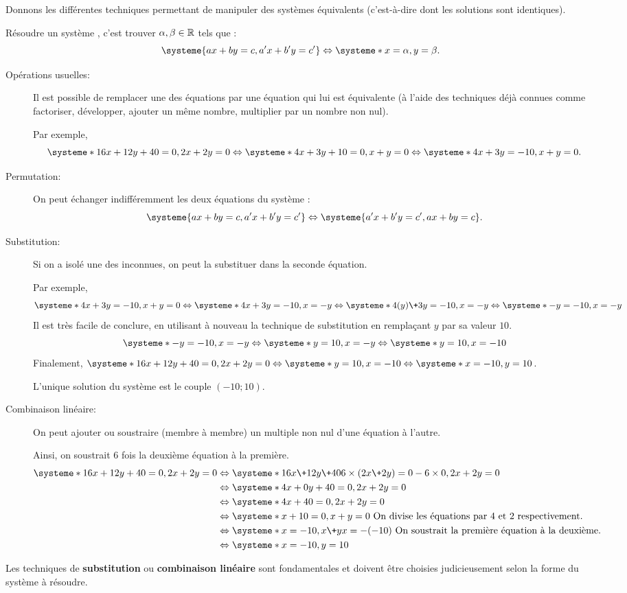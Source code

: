 \documentclass[cours,couleur]{mathsRC}
\begin{document}
\begin{methode}
Donnons les différentes techniques permettant de manipuler des systèmes équivalents (c'est-à-dire dont les solutions sont identiques). 

Résoudre un système  , c'est trouver $\alpha,\beta\in\mathbb{R}$ tels que :
\[
\systeme{ax+by=c,a'x+b'y=c'} \ssi \systeme*{x=\alpha,y=\beta}.
\]
\begin{description}
\item[Opérations usuelles:]
Il est possible de remplacer une des équations par une équation qui lui est équivalente (à l'aide des techniques déjà connues comme factoriser, développer, ajouter un même nombre, multiplier par un nombre non nul). 

Par exemple, 
\[
\systeme*{16x+12y+40=0,2x+2y=0} \ssi \systeme*{4x+3y+10=0,x+y=0} \ssi \systeme*{4x+3y=-10,x+y=0}.
\]
\item[Permutation:] On peut échanger indifféremment les deux équations du système : 
\[
\systeme{ax+by=c,a'x+b'y=c'} \ssi \systeme{a'x+b'y=c',ax+by=c}.
\]
\item[Substitution:] Si on a isolé une des inconnues, on peut la substituer dans la seconde équation.

Par exemple,
\[
\systeme*{4x+3y=-10,x+y=0} \ssi \systeme*{4x+3y=-10,x=-y} \ssi \systeme*{4(\-y)\+3y= -10,x= -y} \ssi \systeme*{-y=-10,x=-y}
\]
Il est très facile de conclure, en utilisant à nouveau la technique de substitution en remplaçant $y$ par sa valeur $10$.
\[
\systeme*{-y=-10,x=-y} \ssi \systeme*{y=10,x=-y} \ssi \systeme*{y=10,x=-10}
\]
Finalement, $\systeme*{16x+12y+40=0,2x+2y=0} \ssi \systeme*{y=10,x=-10} \ssi \systeme*{x=-10,y=10}$.

L'unique solution du système  est le couple $(-10;10)$.
\item[Combinaison linéaire:]
On peut ajouter ou soustraire (membre à membre) un multiple non nul d'une équation à l'autre.

Ainsi, on soustrait $6$ fois la deuxième équation à la première.
\begin{align*}
\systeme*{16x+12y+40=0,2x+2y=0} &\ssi \systeme*{16x\+12y\+40\-6\times(2x\+2y)=0-6\times 0,2x+2y=0} \\
&\ssi \systeme*{4x+0y+40=0,2x+2y=0}\\
&\ssi \systeme*{4x+40=0,2x+2y=0}\\
&\ssi \systeme*{x+10=0,x+y=0} \ \text{On divise les équations par $4$ et $2$ respectivement.}\\
&\ssi \systeme*{x=-10,x\+y\-x=-(-10)} \ \text{On soustrait la première équation à la deuxième.}\\
&\ssi \systeme*{x=-10,y=10}\\
\end{align*}
\end{description}
\end{methode}

\begin{remarque}
Les techniques de \textbf{substitution} ou \textbf{combinaison linéaire} sont fondamentales et doivent être choisies judicieusement selon la forme du système à résoudre.
\end{remarque}

\end{document}
